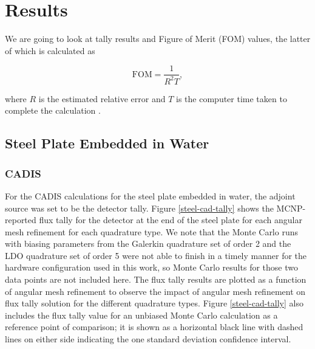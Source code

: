 \documentclass{article} %
\begin{document}
\section{Results}
\label{sec:results}

We are going to look at tally results and Figure of Merit (FOM) values, the
latter of which is calculated as

\begin{equation}
\text{FOM} = \frac{1}{R^2T},
\label{eq:fom}
\end{equation}

\noindent where $R$ is the estimated relative error and $T$ is
the computer time taken to complete the calculation \cite{mcnp}.

\subsection{Steel Plate Embedded in Water}

\subsubsection{CADIS}

For the CADIS calculations for the steel plate embedded in water, the adjoint
source was set to be the detector tally. Figure \ref{steel-cad-tally} shows
the MCNP-reported flux tally for the detector at the end of the steel plate
for each angular mesh refinement for each quadrature type. We note that the
Monte Carlo runs with biasing parameters from the Galerkin quadrature set of
order 2 and the LDO quadrature set of order 5 were not able to finish in a
timely manner for the hardware configuration used in this work, so Monte Carlo
results for those two data points are not included here. The flux tally
results are plotted as a function of angular mesh refinement to observe the
impact of angular mesh refinement on flux tally solution for the different
quadrature types. Figure \ref{steel-cad-tally} also includes the flux tally
value for an unbiased Monte Carlo calculation as a reference point of
comparison; it is shown as a horizontal black line with dashed lines on either
side indicating the one standard deviation confidence interval.
\end{document}
